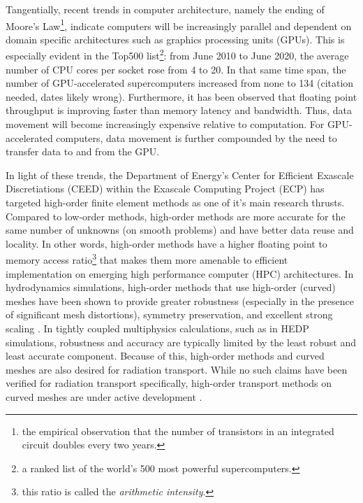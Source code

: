 \documentclass[doc.tex]{subfiles}
\begin{document}
Tangentially, recent trends in computer architecture, namely the ending of Moore's Law\footnote{the empirical observation that the number of transistors in an integrated circuit doubles every two years.}, indicate computers will be increasingly parallel and dependent on domain specific architectures such as graphics processing units (GPUs). This is especially evident in the Top500 list\footnote{a ranked list of the world's 500 most powerful supercomputers.}: from June 2010 to June 2020, the average number of CPU cores per socket rose from 4 to 20. In that same time span, the number of GPU-accelerated supercomputers increased from none to 134 (citation needed, dates likely wrong). Furthermore, it has been observed that floating point throughput is improving faster than memory latency and bandwidth. Thus, data movement will become increasingly expensive relative to computation. For GPU-accelerated computers, data movement is further compounded by the need to transfer data to and from the GPU. 

In light of these trends, the Department of Energy's Center for Efficient Exascale Discretiations (CEED) within the Exascale Computing Project (ECP) has targeted high-order finite element methods as one of it's main research thrusts. Compared to low-order methods, high-order methods are more accurate for the same number of unknowns (on smooth problems) and have better data reuse and locality. In other words, high-order methods have a higher floating point to memory access ratio\footnote{this ratio is called the \emph{arithmetic intensity}.} that makes them more amenable to efficient implementation on emerging high performance computer (HPC) architectures. In hydrodynamics simulations, high-order methods that use high-order (curved) meshes have been shown to provide greater robustness (especially in the presence of significant mesh distortions), symmetry preservation, and excellent strong scaling \cite{blast,blast2,blast3}. In tightly coupled multiphysics calculations, such as in HEDP simulations, robustness and accuracy are typically limited by the least robust and least accurate component. Because of this, high-order methods and curved meshes are also desired for radiation transport. While no such claims have been verified for radiation transport specifically, high-order transport methods on curved meshes are under active development \cite{graph_sweeps,ldrd_dsa,YEE2020109696,olivier_mandc}. 
\end{document}
